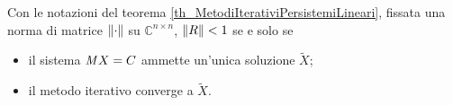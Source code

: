 \begin{Theorem}
  Con le notazioni del teorema \ref{th_MetodiIterativiPersistemiLineari},
  fissata una norma di matrice $\Norm{\cdot}$ su
  $\mathbb{C}^{n \times n}$, $\Norm{\IterationMatrix} < 1$ se e solo
  se
  \begin{itemize}
    \item il sistema $\mathit{M} X = C$ ammette un'unica soluzione $\tilde{X}$;
    \item il metodo iterativo converge a $\tilde{X}$.
  \end{itemize}
\end{Theorem}



